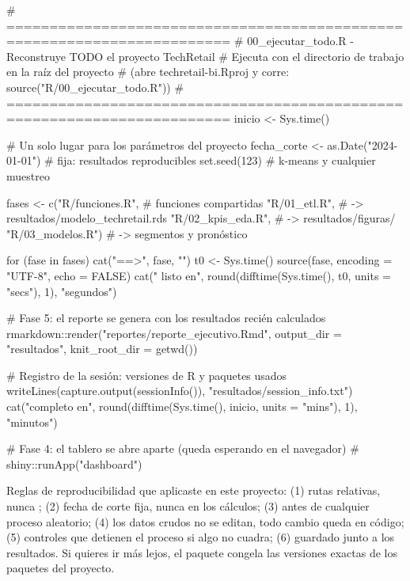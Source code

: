\begin{rnoejecutar}[title=R/00\_ejecutar\_todo.R]
# ========================================================================
# 00_ejecutar_todo.R - Reconstruye TODO el proyecto TechRetail
# Ejecuta con el directorio de trabajo en la raíz del proyecto
# (abre techretail-bi.Rproj y corre: source("R/00_ejecutar_todo.R"))
# ========================================================================
inicio <- Sys.time()

# Un solo lugar para los parámetros del proyecto
fecha_corte <- as.Date("2024-01-01")   # fija: resultados reproducibles
set.seed(123)                          # k-means y cualquier muestreo

fases <- c("R/funciones.R",            # funciones compartidas
           "R/01_etl.R",               # -> resultados/modelo_techretail.rds
           "R/02_kpis_eda.R",          # -> resultados/figuras/
           "R/03_modelos.R")           # -> segmentos y pronóstico

for (fase in fases) {
  cat("\n==>", fase, "\n")
  t0 <- Sys.time()
  source(fase, encoding = "UTF-8", echo = FALSE)
  cat("    listo en", round(difftime(Sys.time(), t0, units = "secs"), 1),
      "segundos\n")
}

# Fase 5: el reporte se genera con los resultados recién calculados
rmarkdown::render("reportes/reporte_ejecutivo.Rmd",
                  output_dir = "resultados",
                  knit_root_dir = getwd())

# Registro de la sesión: versiones de R y paquetes usados
writeLines(capture.output(sessionInfo()), "resultados/session_info.txt")
cat("\nProyecto completo en",
    round(difftime(Sys.time(), inicio, units = "mins"), 1), "minutos\n")

# Fase 4: el tablero se abre aparte (queda esperando en el navegador)
# shiny::runApp("dashboard")
\end{rnoejecutar}

\begin{consejo}
Reglas de reproducibilidad que aplicaste en este proyecto: (1) rutas
relativas, nunca ; (2) fecha de corte fija,
nunca  en los cálculos; (3)  antes de
cualquier proceso aleatorio; (4) los datos crudos no se editan, todo cambio
queda en código; (5) controles  que detienen el proceso
si algo no cuadra; (6)  guardado junto a los
resultados. Si quieres ir más lejos, el paquete  congela las
versiones exactas de los paquetes del proyecto.
\end{consejo}

